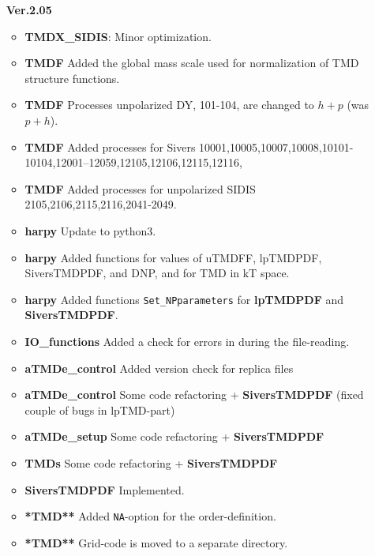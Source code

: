 \documentclass[prd,nofootinbib,eqsecnum,final]{revtex4}
\renewcommand{\(}{\left(}
\renewcommand{\)}{\right)}
\renewcommand{\[}{\left[}
\renewcommand{\]}{\right]}
\begin{document}
\begin{itemize}
\item[\textbf{Ver.2.05}]
\begin{itemize}
	\item \textbf{TMDX\_SIDIS}: Minor optimization.
	\item \textbf{TMDF} Added the global mass scale used for normalization of TMD structure functions.
	\item \textbf{TMDF} Processes unpolarized DY, 101-104, are changed to $h+p$ (was $p+h$).
	\item \textbf{TMDF} Added processes for Sivers 10001,10005,10007,10008,10101-10104,12001--12059,12105,12106,12115,12116,
	\item \textbf{TMDF} Added processes for unpolarized SIDIS 2105,2106,2115,2116,2041-2049.
	\item \textbf{harpy} Update to python3.
	\item \textbf{harpy} Added functions for values of uTMDFF, lpTMDPDF, SiversTMDPDF, and DNP, and for TMD in kT space.
	\item \textbf{harpy} Added functions \texttt{Set\_NPparameters} for \textbf{lpTMDPDF} and \textbf{SiversTMDPDF}.
	\item \textbf{IO\_functions} Added a check for errors in during the file-reading.
	\item \textbf{aTMDe\_control} Added version check for replica files
	\item \textbf{aTMDe\_control} Some code refactoring + \textbf{SiversTMDPDF} (fixed couple of bugs in lpTMD-part)
	\item \textbf{aTMDe\_setup} Some code refactoring + \textbf{SiversTMDPDF}
	\item \textbf{TMDs} Some code refactoring + \textbf{SiversTMDPDF}
	\item \textbf{SiversTMDPDF} Implemented.
	\item \textbf{*TMD**} Added \texttt{NA}-option for the order-definition.
	\item \textbf{*TMD**} Grid-code is moved to a separate directory.
\end{itemize}


\end{itemize}
\end{document}

